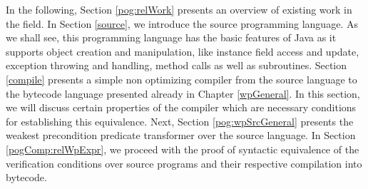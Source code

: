 In the following, Section \ref{pog:relWork} presents an overview of existing work in the field. In Section \ref{source}, 
 we introduce the source programming language. As we shall see,
this programming language has the basic features of Java as it supports object creation and manipulation, like instance 
field access and  update, exception throwing and handling, method calls as well as subroutines. Section \ref{compile} presents a simple non optimizing compiler from the source language to the bytecode language presented already in Chapter \ref{wpGeneral}. In this section, we will discuss certain properties of the 
compiler which are necessary conditions for establishing this equivalence. Next, Section \ref{pog:wpSrcGeneral} presents the weakest precondition predicate 
transformer over the source language. In Section \ref{pogComp:relWpExpr}, we proceed with the proof of syntactic equivalence of
 the verification conditions over source programs and their respective compilation into bytecode.
 








